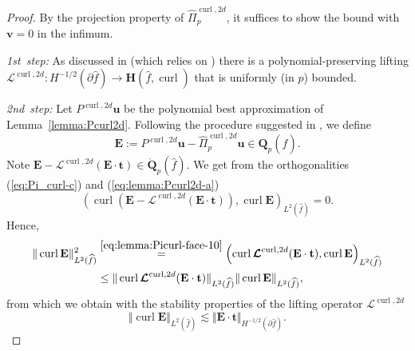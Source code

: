\documentclass{article}
\newcommand{\hatPicurlcomtwod}{\widehat \Pi^{\operatorname*{curl},2d}_p}
\begin{document}
\begin{proof}
By the projection property of $\hatPicurlcomtwod$, it suffices to show the bound 
with ${\mathbf v} = 0$ in the infimum.

\emph{1st~step:} 
As
discussed in \cite[Sec.~{4.2}]{demkowicz08} (which relies on
\cite{ainsworth-demkowicz09}) there is a polynomial-preserving lifting
$\boldsymbol{\mathcal{L}}^{\operatorname*{curl},2d}\!:\!H^{-1/2}(\partial \widehat{f})\!\rightarrow\!
{\mathbf{H}}(\widehat{f},\operatorname*{curl})$ that is uniformly (in $p$) bounded.

\emph{2nd~step:} Let $P^{\operatorname*{curl},2d}{\mathbf{u}}$ be the
polynomial best approximation of Lemma~\ref{lemma:Pcurl2d}. Following the
procedure suggested in \cite{demkowicz08}, we define
\[
{\mathbf{E}}:=P^{\operatorname*{curl},2d}{\mathbf{u}}-\hatPicurlcomtwod{\mathbf{u}}
\in \mathbf{Q}_p(\widehat{f}).
\]
Note ${\mathbf{E}}-\boldsymbol{\mathcal{L}}^{\operatorname*{curl},2d}({\mathbf{E}}\cdot \mathbf{t})\in\mathring{\mathbf{Q}}_p(\widehat{f})$. We get from the
orthogonalities (\ref{eq:Pi_curl-c}) and (\ref{eq:lemma:Pcurl2d-a})
\begin{equation}
(\operatorname{curl}({\mathbf{E}}-\boldsymbol{\mathcal{L}}^{\operatorname*{curl},2d}%
({\mathbf{E}}\cdot\mathbf{t})),\operatorname{curl}{\mathbf{E}})_{L^{2}(\widehat{f})}=0. 
\label{eq:lemma:Picurl-face-10}%
\end{equation}
Hence,
\begin{align*}
\Vert\operatorname{curl}{\mathbf{E}}\Vert_{L^{2}(\widehat{f})}^{2}  
&\stackrel{\eqref{eq:lemma:Picurl-face-10}}{=}
\left(  \operatorname{curl}\boldsymbol{\mathcal{L}}^{\operatorname*{curl},2d%
}({\mathbf{E}}\cdot\mathbf{t}),\operatorname{curl}{\mathbf{E}}\right)
_{L^{2}(\widehat{f})}\\
& \leq  
\Vert
\operatorname{curl}\boldsymbol{\mathcal{L}}^{\operatorname*{curl},2d}({\mathbf{E}}\cdot\mathbf{t})\Vert_{L^{2}(\widehat{f})}\Vert\operatorname{curl}{\mathbf{E}}\Vert_{L^{2}(\widehat{f})},
\end{align*}
from which we obtain with the stability properties of the lifting operator $\boldsymbol{\mathcal{L}}^{\operatorname*{curl},2d}$
\begin{equation}
\Vert\operatorname{curl}{\mathbf{E}}\Vert_{L^{2}(\widehat{f})}\lesssim\Vert{\mathbf{E}}\cdot\mathbf{t}\Vert_{H^{-1/2}(\partial \widehat{f})}.
\label{eq:lemma:Picurl-face-20}%
\end{equation}


\end{proof}
\end{document}

